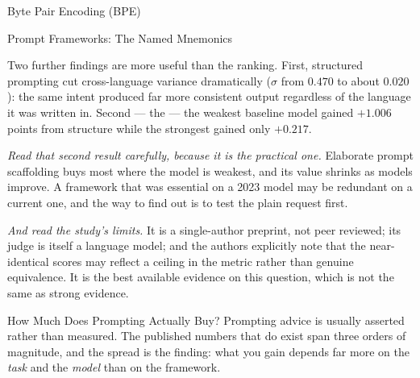 \begin{v3topic}{Byte Pair Encoding (BPE)}
\begin{v3topic}{Prompt Frameworks: The Named Mnemonics}
\begin{engineernote}
Two further findings are more useful than the ranking. First, structured
prompting cut cross-language variance dramatically ($\sigma$ from $0.470$ to
about $0.020$): the same intent produced far more consistent output regardless
of the language it was written in. Second --- the  --- the weakest baseline model gained $+1.006$ points from
structure while the strongest gained only $+0.217$.

\emph{Read that second result carefully, because it is the practical one.}
Elaborate prompt scaffolding buys most where the model is weakest, and its
value shrinks as models improve. A framework that was essential on a 2023
model may be redundant on a current one, and the way to find out is to test
the plain request first.

\emph{And read the study's limits.} It is a single-author preprint, not peer
reviewed; its judge is itself a language model; and the authors explicitly
note that the near-identical scores may reflect a ceiling in the metric rather
than genuine equivalence. It is the best available evidence on this question,
which is not the same as strong evidence.
\end{engineernote}

\begin{v3topic}{How Much Does Prompting Actually Buy?}
    Prompting advice is usually asserted rather than measured. The published
    numbers that do exist span three orders of magnitude, and the spread is the
    finding: what you gain depends far more on the \emph{task} and the
    \emph{model} than on the framework.


\end{v3topic}
\end{v3topic}
\end{v3topic}
